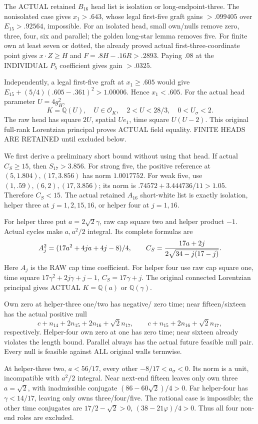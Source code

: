 \documentclass[11pt]{article}
\begin{document}
The ACTUAL retained \(B_{16}\) head list is
isolation or long-endpoint-three.
The nonisolated case gives \(x_1>.643\),
whose legal first-five graft gains \(>.099405\)
over \(E_{15}>.92564\), impossible.
For an isolated head, small own/nulls remove
zero, three, four, six and parallel;
the golden long-star lemma removes five.
For finite own at least seven or dotted, the
already proved actual first-three-coordinate
point gives \(x\cdot Z\ge H\) and
\(F=.8H-.16R>.2893\).
Paying \(.08\) at the INDIVIDUAL \(P_5\)
coefficient gives gain \(>.0325\).

Independently, a legal first-five graft at
\(x_1\ge.605\) would give
\(E_{15}+(5/4)(.605-.361)^2>1.00006\).
Hence \(x_1<.605\).
For the actual head parameter \(U=4g_H^2\),
\[
 K=\mathbb Q(U),\quad U\in\mathcal O_K,\quad
               2<U<28/3,\quad0<U_\sigma<2 .
\]
The raw head has square \(2U\), spatial \(Ue_1\),
time square \(U(U-2)\).
This original full-rank Lorentzian principal
proves ACTUAL field equality.
FINITE HEADS ARE RETAINED until excluded below.

We first derive a preliminary short bound without
using that head.
If actual \(C_S\ge15\), then \(S_{17}>3.856\).
For strong five, the positive reference at
\((5,1.804),(17,3.856)\) has norm \(1.0017752\).
For weak five, use \((1,.59),(6,2),(17,3.856)\);
its norm is \(.74572+3.444736/11>1.05\).
Therefore \(C_S<15\).
The actual retained \(A_{16}\) short-white list
is exactly isolation, helper three at
\(j=1,2,15,16\), or helper four at \(j=1,16\).

For helper three put \(a=2\sqrt2\gamma\),
raw cap square two and helper product \(-1\).
Actual cycles make \(a,a^2/2\) integral.
Its complete formulas are
\[
 A_j^2=(17a^2+4ja+4j-8)/4,\qquad
 C_S={17a+2j\over2\sqrt{34-j(17-j)}} .
\]
Here \(A_j\) is the RAW cap time coefficient.
For helper four use raw cap square one,
time square \(17\gamma^2+2j\gamma+j-1\),
\(C_S=17\gamma+j\).
The original connected Lorentzian principal gives
ACTUAL \(K=\mathbb Q(a)\) or \(\mathbb Q(\gamma)\).

Own zero at helper-three one/two has negative/
zero time; near fifteen/sixteen has the actual
positive null
\[
 c+n_{14}+2n_{15}+2n_{16}+\sqrt2n_{17},\qquad
 c+n_{15}+2n_{16}+\sqrt2n_{17},
\]
respectively.
Helper-four own zero at one has zero time;
near sixteen already violates the length bound.
Parallel always has the actual future feasible
null pair.
Every null is feasible against ALL original
walls termwise.

At helper-three two,
\(a<56/17\), every other \(-8/17<a_\sigma<0\).
Its norm is a unit, incompatible with
\(a^2/2\) integral.
Near next-end fifteen leaves only own three
\(a=\sqrt2\), with inadmissible conjugate
\((86-60\sqrt2)/4>0\).
Far helper-four has \(\gamma<14/17\), leaving
only owns three/four/five.
The rational case is impossible;
the other time conjugates are
\(17/2-\sqrt2>0\), \((38-21\varphi)/4>0\).
Thus all four non-end roles are excluded.
\end{document}
